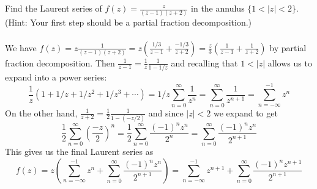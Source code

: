 \documentclass[11pt]{exam}
\newcommand{\C}{\mathbb{C}}
\newcommand{\ds}{\displaystyle}
\begin{document}
\begin{questions}
  \question
  Find the Laurent series of $\ds f(z) = \frac{z}{(z-1)(z+2)}$ in the
  annulus $\{ 1<|z|<2 \}$. (Hint: Your first step should be a partial
  fraction decomposition.) \\\\
  We have $\ds f(z) = z \frac{1}{(z-1)(z+2)} = z \left( \frac{1/3}{z-1} + \frac{-1/3}{z+2} \right) = \frac{z}{3} \left( \frac{1}{z-1} + \frac{1}{z+2} \right)$ by partial fraction decomposition.
  Then $\ds \frac{1}{z-1} = \frac{1}{z} \frac{1}{1-1/z} $ and recalling that $1 < |z|$ allows us to expand into a power series:
  $$\ds \frac{1}{z} \left( 1 + 1/z + 1/z^2 + 1/z^3 + \cdots \right) = 1/z \sum _{n=0}^\infty \frac{1}{z^n} = \sum _{n=0}^\infty \frac{1}{z^{n+1}} = \sum _{n=-\infty}^{-1} z^n $$
  On the other hand, $\ds \frac{1}{z+2} = \frac{1}{2} \frac{1}{1 - (-z/2)}$ and since $|z| < 2$ we expand to get
  $$ \frac{1}{2} \sum _{n=0}^\infty \left( \frac{-z}{2} \right)^n
  = \frac{1}{2} \sum _{n=0}^\infty \frac{(-1)^n z^n}{2^n}
  = \sum _{n=0}^\infty \frac{(-1)^n z^n}{2^{n+1}} $$
  This gives us the final Laurent series as
  $$ f(z)
  = z \left( \sum _{n=-\infty}^{-1} z^n + \sum _{n=0}^\infty \frac{(-1)^n z^n}{2^{n+1}} \right)
  = \sum _{n=-\infty}^{-1} z^{n+1} + \sum _{n=0}^\infty \frac{(-1)^n z^{n+1}}{2^{n+1}}
  $$

  \question
\end{questions}
\end{document}
